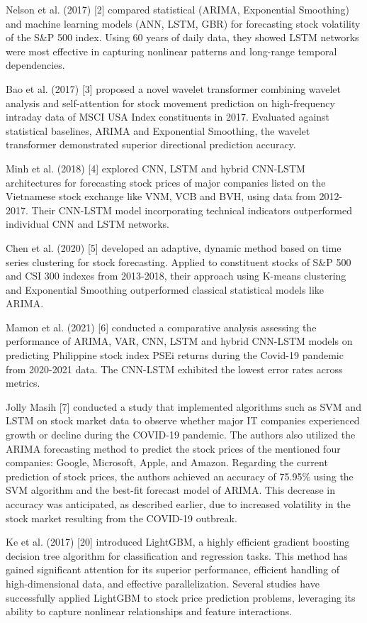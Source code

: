 \documentclass{ieeeojies}
\begin{document}
Nelson et al. (2017) [2] compared statistical (ARIMA, Exponential Smoothing) and machine learning models (ANN, LSTM, GBR) for forecasting stock volatility of the S\&P 500 index. Using 60 years of daily data, they showed LSTM networks were most effective in capturing nonlinear patterns and long-range temporal dependencies.

Bao et al. (2017) [3] proposed a novel wavelet transformer combining wavelet analysis and self-attention for stock movement prediction on high-frequency intraday data of MSCI USA Index constituents in 2017. Evaluated against statistical baselines, ARIMA and Exponential Smoothing, the wavelet transformer demonstrated superior directional prediction accuracy.

Minh et al. (2018) [4] explored CNN, LSTM and hybrid CNN-LSTM architectures for forecasting stock prices of major companies listed on the Vietnamese stock exchange like VNM, VCB and BVH, using data from 2012-2017. Their CNN-LSTM model incorporating technical indicators outperformed individual CNN and LSTM networks.

Chen et al. (2020) [5] developed an adaptive, dynamic method based on time series clustering for stock forecasting. Applied to constituent stocks of S\&P 500 and CSI 300 indexes from 2013-2018, their approach using K-means clustering and Exponential Smoothing outperformed classical statistical models like ARIMA.

Mamon et al. (2021) [6] conducted a comparative analysis assessing the performance of ARIMA, VAR, CNN, LSTM and hybrid CNN-LSTM models on predicting Philippine stock index PSEi returns during the Covid-19 pandemic from 2020-2021 data. The CNN-LSTM exhibited the lowest error rates across metrics.

Jolly Masih [7] conducted a study that implemented algorithms such as SVM and LSTM on stock market data to observe whether major IT companies experienced growth or decline during the COVID-19 pandemic. The authors also utilized the ARIMA forecasting method to predict the stock prices of the mentioned four companies: Google, Microsoft, Apple, and Amazon. Regarding the current prediction of stock prices, the authors achieved an accuracy of 75.95\% using the SVM algorithm and the best-fit forecast model of ARIMA. This decrease in accuracy was anticipated, as described earlier, due to increased volatility in the stock market resulting from the COVID-19 outbreak. 

Ke et al. (2017) [20] introduced LightGBM, a highly efficient gradient boosting decision tree algorithm for classification and regression tasks. This method has gained significant attention for its superior performance, efficient handling of high-dimensional data, and effective parallelization. Several studies have successfully applied LightGBM to stock price prediction problems, leveraging its ability to capture nonlinear relationships and feature interactions. 
 \\
\end{document}
